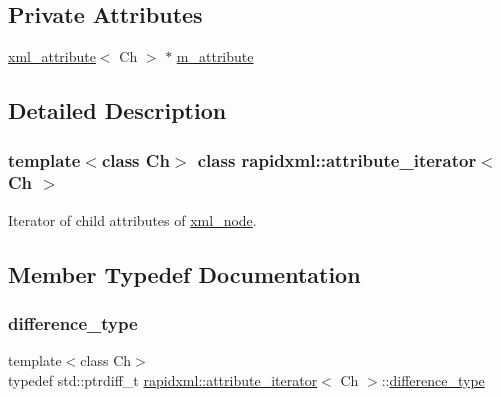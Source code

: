 \subsection*{Private Attributes}
\begin{DoxyCompactItemize}
\item 
\mbox{\hyperlink{classrapidxml_1_1xml__attribute}{xml\+\_\+attribute}}$<$ Ch $>$ $\ast$ \mbox{\hyperlink{classrapidxml_1_1attribute__iterator_a2b4de1b0d86015beeae10e9997438c7a}{m\+\_\+attribute}}
\end{DoxyCompactItemize}


\subsection{Detailed Description}
\subsubsection*{template$<$class Ch$>$\newline
class rapidxml\+::attribute\+\_\+iterator$<$ Ch $>$}

Iterator of child attributes of \mbox{\hyperlink{classrapidxml_1_1xml__node}{xml\+\_\+node}}. 

\subsection{Member Typedef Documentation}
\mbox{\label{classrapidxml_1_1attribute__iterator_accfd6d8527d32b427496b42f71a2e37a}} 
\subsubsection{\texorpdfstring{difference\_type}{difference\_type}}
{\footnotesize\ttfamily template$<$class Ch$>$ \\
typedef std\+::ptrdiff\+\_\+t \mbox{\hyperlink{classrapidxml_1_1attribute__iterator}{rapidxml\+::attribute\+\_\+iterator}}$<$ Ch $>$\+::\mbox{\hyperlink{classrapidxml_1_1attribute__iterator_accfd6d8527d32b427496b42f71a2e37a}{difference\+\_\+type}}}

\mbox{\label{classrapidxml_1_1attribute__iterator_a97ac5d8b98f5b03c68cc566f5ac0a9e0}} 
